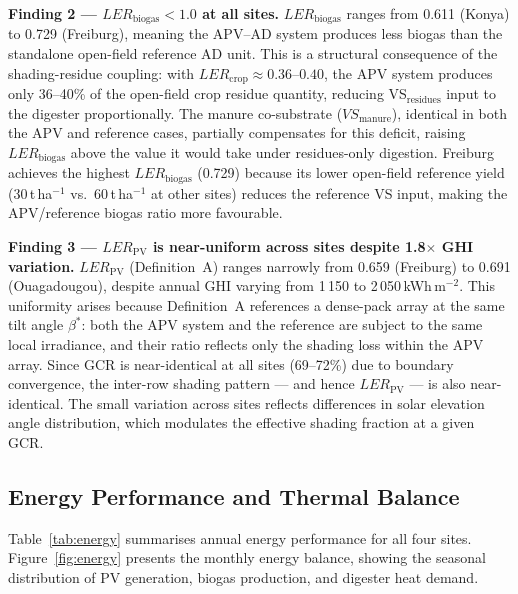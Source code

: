 \textbf{Finding 2 --- $LER_{\text{biogas}} < 1.0$ at all sites.}
$LER_{\text{biogas}}$ ranges from 0.611 (Konya) to 0.729 (Freiburg),
meaning the APV--AD system produces less biogas than the standalone
open-field reference AD unit. This is a structural consequence of
the shading-residue coupling: with $LER_{\text{crop}} \approx 0.36$--$0.40$,
the APV system produces only 36--40\% of the open-field crop residue
quantity, reducing VS$_{\text{residues}}$ input to the digester
proportionally. The manure co-substrate ($VS_{\text{manure}}$),
identical in both the APV and reference cases, partially compensates
for this deficit, raising $LER_{\text{biogas}}$ above the value it
would take under residues-only digestion. Freiburg achieves the
highest $LER_{\text{biogas}}$ (0.729) because its lower open-field
reference yield (30\,t\,ha$^{-1}$ vs.\ 60\,t\,ha$^{-1}$ at other
sites) reduces the reference VS input, making the APV/reference
biogas ratio more favourable.

\textbf{Finding 3 --- $LER_{\text{PV}}$ is near-uniform across sites
	despite 1.8$\times$ GHI variation.}
$LER_{\text{PV}}$ (Definition~A) ranges narrowly from 0.659 (Freiburg)
to 0.691 (Ouagadougou), despite annual GHI varying from
1\,150 to 2\,050\,kWh\,m$^{-2}$. This uniformity arises because
Definition~A references a dense-pack array at the same tilt angle
$\beta^*$: both the APV system and the reference are subject to the
same local irradiance, and their ratio reflects only the shading
loss within the APV array. Since GCR is near-identical at all sites
(69--72\%) due to boundary convergence, the inter-row shading pattern
--- and hence $LER_{\text{PV}}$ --- is also near-identical. The small
variation across sites reflects differences in solar elevation angle
distribution, which modulates the effective shading fraction at a
given GCR.

\subsection{Energy Performance and Thermal Balance}
\label{sec:results_energy}

\hspace{1cm}Table~\ref{tab:energy} summarises annual energy performance
for all four sites. Figure~\ref{fig:energy} presents the monthly energy
balance, showing the seasonal distribution of PV generation, biogas
production, and digester heat demand.

